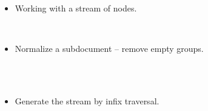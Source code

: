 \documentclass{beamer}
\begin{document}
\begin{itemize}
  \item Working with a stream of nodes.
  
  {}{\hlopt{(}}{}{\hlopt{, }}{}{\hlopt{)
  }}{}{\hlopt{=}}{}\\
  {\hlstd{ \ }}{}{}{}{\hlopt{*
  }}{}{\hlopt{\textbar }}{}{}{}{}{}{}{}{}{}{\hlendline{}}
  
  \item Normalize a subdocument -- remove empty groups.
  
  {}{}{\hlopt{=
  }}{}{\hlendline{}}\\
  {\hlstd{ \ }}{\hlopt{\textbar }}{}{}{\hlopt{->
  }}{}{\hlopt{\textbar }}{}{}{\hlstd{ }}{\hlopt{->
  }}{}{\hlendline{}}\\
  {\hlstd{ \ }}{\hlopt{\textbar }}{}{\hlopt{(}}{}{}{\hlopt{, }}{}{\hlopt{) -> }}{}{\hlopt{-> }}{}{}{\hlendline{}}
  
  \item Generate the stream by infix traversal.
  

\end{itemize}
\end{document}
